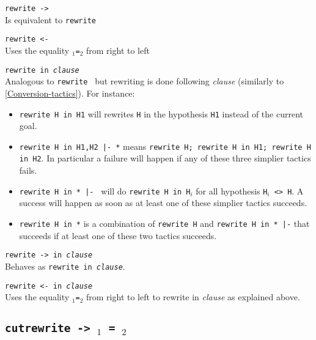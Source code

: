 \begin{Variants}
\item {\tt rewrite -> {\term}}\\
  Is equivalent to {\tt rewrite \term}

\item {\tt rewrite <- {\term}}\\
  Uses the equality \term$_1${\tt=}\term$_2$ from right to left

\item {\tt rewrite {\term} in \textit{clause}}
  \\
  Analogous to {\tt rewrite {\term}} but rewriting is done following
  \textit{clause} (similarly to \ref{Conversion-tactics}). For
  instance:
  \begin{itemize}
  \item \texttt{rewrite H in H1} will rewrites \texttt{H} in the hypothesis
    \texttt{H1} instead of the current goal.
  \item \texttt{rewrite H in H1,H2 |- *} means \texttt{rewrite H; rewrite H in H1;
      rewrite H in H2}. In particular a failure will happen if any of
    these three simplier tactics fails. 
  \item \texttt{rewrite H in * |- } will do \texttt{rewrite H in
      H$_i$} for all hypothesis \texttt{H$_i$ <> H}. A success will happen
    as soon as at least one of these simplier tactics succeeds.
  \item \texttt{rewrite H in *} is a combination of \texttt{rewrite H} 
    and \texttt{rewrite H in * |-} that succeeds if at
    least one of these two tactics succeeds. 
  \end{itemize}

\item {\tt rewrite -> {\term} in \textit{clause}}
  \\
  Behaves as {\tt rewrite {\term} in \textit{clause}}.
 
\item {\tt rewrite <- {\term} in \textit{clause}}\\
  Uses the equality \term$_1${\tt=}\term$_2$ from right to left to
  rewrite in \textit{clause} as explained above.
\end{Variants}


\subsection{\tt cutrewrite -> \term$_1$ = \term$_2$
\label{cutrewrite}
}

